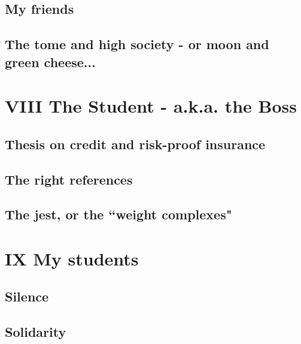 
\subsection{My friends}


\subsection{The tome and high society - or moon and green cheese...}


\section{VIII The Student - a.k.a. the Boss}

\subsection{Thesis on credit and risk-proof insurance}





\subsection{The right references}


\subsection{The jest, or the ``weight complexes"}


\section{IX My students}

\subsection{Silence}



\subsection{Solidarity}

